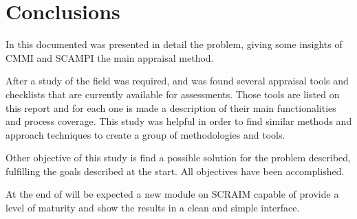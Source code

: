 \chapter{Conclusions} \label{chap:concl} 

In this documented was presented in detail the problem, giving some insights of CMMI and SCAMPI the main appraisal method.

After a study of the field was required, and was found several appraisal tools and checklists that are currently available for assessments. Those tools are listed on this report and for each one is made a description of their main functionalities and process coverage. This study was helpful in order to find similar methods and approach techniques to create a group of methodologies and tools.

Other objective of this study is find a possible solution for the problem described, fulfilling the goals described at the start. All objectives have been accomplished.

At the end of will be expected a new module on SCRAIM capable of provide a level of maturity and show the results in a clean and simple interface.